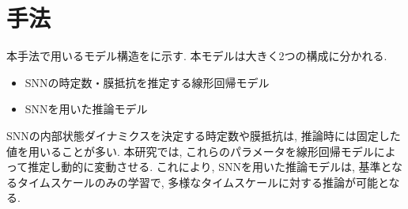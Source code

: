 \section{手法}

本手法で用いるモデル構造をに示す.
本モデルは大きく2つの構成に分かれる.
\begin{itemize}
    \item SNNの時定数・膜抵抗を推定する線形回帰モデル
    \item SNNを用いた推論モデル
\end{itemize}
SNNの内部状態ダイナミクスを決定する時定数や膜抵抗は, 推論時には固定した値を用いることが多い\cite{zheng2024temporal}\cite{ParametricSNN}.
本研究では, これらのパラメータを線形回帰モデルによって推定し動的に変動させる.
これにより, SNNを用いた推論モデルは, 基準となるタイムスケールのみの学習で, 多様なタイムスケールに対する推論が可能となる.



